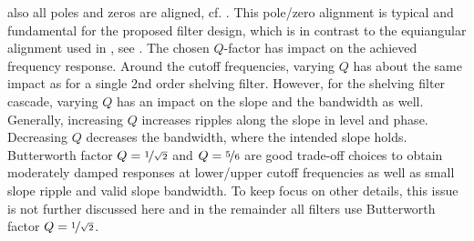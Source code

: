 also all poles and zeros are aligned, cf.
.
%
This pole/zero alignment is typical and fundamental \cite{Helie2013}
for the proposed filter design, which is in contrast to the equiangular
alignment used in
\cite{Holters2006a}, see .
%
%
%
\NewL The chosen $Q$-factor has impact on the achieved frequency response.
%
Around the cutoff frequencies, varying $Q$ has about the same impact as for a
single 2nd order shelving filter.
%
However, for the shelving filter cascade, varying $Q$ has an impact
on the slope and the bandwidth as well.
%
Generally, increasing $Q$ increases ripples along the slope in level and
phase.
%
Decreasing $Q$ decreases the bandwidth, where the intended slope holds.
%
Butterworth factor $Q=\nicefrac{1}{\sqrt{2}}$ and
$Q=\nicefrac{5}{6}$ \cite[p.261]{LangeSigSys1} are good
trade-off choices to obtain moderately damped responses at lower/upper
cutoff frequencies as well as small slope ripple and valid slope bandwidth.
%
To keep focus on other details, this issue is not further
discussed here and in the remainder all filters use Butterworth factor
$Q=\nicefrac{1}{\sqrt{2}}$.




